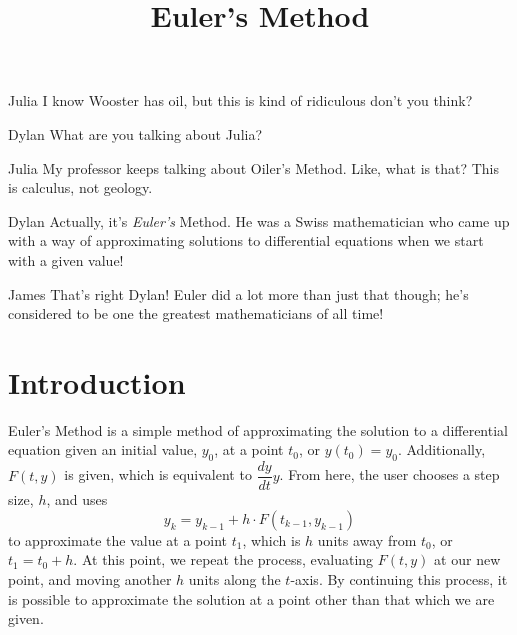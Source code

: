 \documentclass{ximera}
\title{Euler's Method}
\begin{document}
\maketitle
\begin{dialogue}
\item[Julia] I know Wooster has oil, but this is kind of ridiculous don't you think?
\item[Dylan] What are you talking about Julia?
\item[Julia] My professor keeps talking about Oiler's Method. Like, what is that? This is calculus, not geology.
\item[Dylan] Actually, it's \textit{Euler's} Method. He was a Swiss mathematician who came up with a way of approximating solutions to differential equations when we start with a given value!
\item[James] That's right Dylan! Euler did a lot more than just that though; he's considered to be one the greatest mathematicians of all time!
\end{dialogue}

\section{Introduction}
Euler's Method is a simple method of approximating the solution to a differential equation given an initial value, $y_0$, at a point $t_0$, or $y(t_0) = y_0$. Additionally, $F(t, y)$ is given, which is equivalent to $\dfrac{dy}{dt} y$. From here, the user chooses a step size, $h$, and uses $$y_k = y_{k-1} + h \cdot F(t_{k-1}, y_{k-1})$$ to approximate the value at a point $t_1$, which is $h$ units away from $t_0$, or $t_1 = t_0 + h$. At this point, we repeat the process, evaluating $F(t, y)$ at our new point, and moving another $h$ units along the $t$-axis. By continuing this process, it is possible to approximate the solution at a point other than that which we are given.
\end{document}
